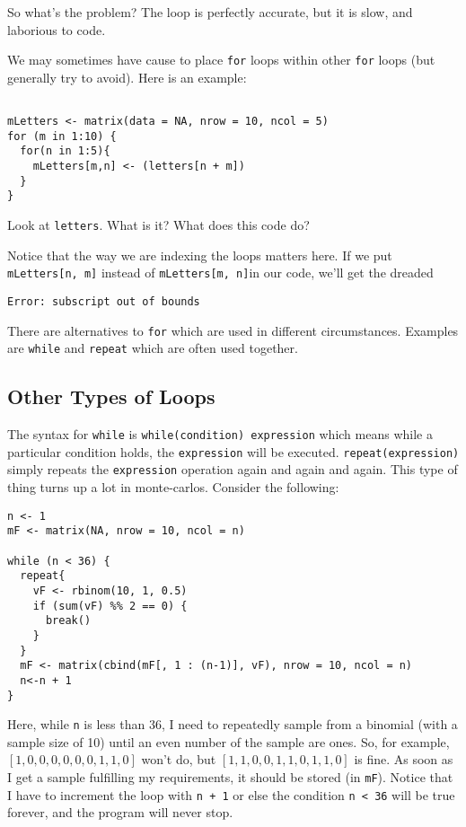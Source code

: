 So what's the problem?  The loop is perfectly accurate, but it is
slow, and laborious to code. 

We may sometimes have cause to place \texttt{for} loops within other
\texttt{for} loops (but generally try to avoid). Here is an example:
\begin{verbatim}

mLetters <- matrix(data = NA, nrow = 10, ncol = 5)
for (m in 1:10) {
  for(n in 1:5){
    mLetters[m,n] <- (letters[n + m])
  }
}
\end{verbatim}

Look at \texttt{letters}. What is it? What does this code do?

Notice that the way we are indexing the loops
matters here.  If we put \texttt{mLetters[n, m]} instead of
\texttt{mLetters[m, n]}in our code, we'll get the dreaded
\begin{verbatim}
Error: subscript out of bounds
\end{verbatim}
There are alternatives to \texttt{for} which are used in different
circumstances.  Examples are \texttt{while} and \texttt{repeat}
which are often used together.

\subsection*{Other Types of Loops}
The syntax for \texttt{while} is \texttt{while(condition)
expression} which means while a particular condition holds, the
\texttt{expression} will be executed. \texttt{repeat(expression)}
simply repeats the \texttt{expression} operation again and again and
again.  This type of thing turns up a lot in monte-carlos. Consider
the following:
\begin{verbatim}
n <- 1
mF <- matrix(NA, nrow = 10, ncol = n)

while (n < 36) {
  repeat{
    vF <- rbinom(10, 1, 0.5)
    if (sum(vF) %% 2 == 0) {
      break()
    }
  }
  mF <- matrix(cbind(mF[, 1 : (n-1)], vF), nrow = 10, ncol = n)
  n<-n + 1
}
\end{verbatim}
Here, while \texttt{n} is less than 36, I need to repeatedly sample
from a binomial (with a sample size of 10) until an even number of
the sample are ones.  So, for example, $[1,0,0,0,0,0,0,1,1,0]$ won't
do, but $[1,1,0,0,1,1,0,1,1,0]$ is fine. As soon as I get a sample
fulfilling my requirements, it should be stored (in \texttt{mF}).
Notice that I have to increment the loop with \texttt{n + 1} or else
the condition \texttt{n < 36} will be true forever, and the program
will never stop.

